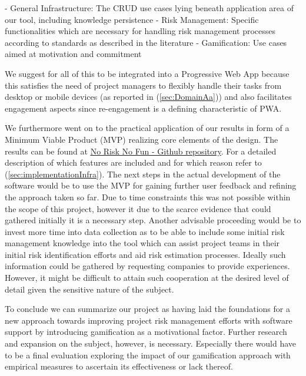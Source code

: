 -	General Infrastructure: The CRUD use cases lying beneath application area of our tool, including knowledge persistence 
-	Risk Management: Specific functionalities which are necessary for handling risk management processes according to standards as described in the literature
-	Gamification: Use cases aimed at motivation and commitment

We suggest for all of this to be integrated into a Progressive Web App because this satisfies the need of project managers to flexibly handle their tasks from desktop or mobile devices (as reported in (\ref{sec:DomainAa})) and also facilitates engagement aspects since re-engagement is a defining characteristic of PWA.

We furthermore went on to the practical application of our results in form of a Minimum Viable Product (MVP) realizing core elements of the design. The results can be found at
\underline{\href{https://github.com/Risk-Busters/NoRiskNoFun}{No Risk No Fun - Github repository}}. For a detailed description of which features are included and for which reason refer to (\ref{sec:implementationInfra}).
The next steps in the actual development of the software would be to use the MVP for gaining further user feedback and refining the approach taken so far. Due to time constraints this was not possible within the scope of this project, however it due to the scarce evidence that could gathered initially it is a necessary step.
Another advisable proceeding would be to invest more time into data collection as to be able to include some initial risk management knowledge into the tool which can assist project teams in their initial risk identification efforts and aid risk estimation processes. Ideally such information could be gathered by requesting companies to provide experiences. However, it might be difficult to attain such cooperation at the desired level of detail given the sensitive nature of the subject.

To conclude we can summarize our project as having laid the foundations for a new approach towards improving project risk management efforts with software support by introducing gamification as a motivational factor. Further research and expansion on the subject, however, is necessary. Especially there would have to be a final evaluation exploring the impact of our gamification approach with empirical measures to ascertain its effectiveness or lack thereof.




